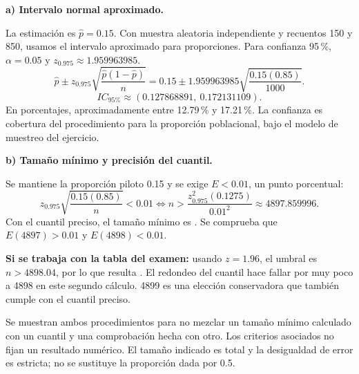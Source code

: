 \textbf{a) Intervalo normal aproximado.}\par\nopagebreak[4]
La estimación es $\widehat p=0.15$. Con muestra aleatoria independiente y recuentos 150 y 850, usamos el intervalo aproximado para proporciones. Para confianza 95\,\%, $\alpha=0.05$ y $z_{0.975}\approx1.959963985$.
\[
\widehat p\pm z_{0.975}\sqrt{\frac{\widehat p(1-\widehat p)}n}
=0.15\pm1.959963985\sqrt{\frac{0.15(0.85)}{1000}}.
\]
\[
\boxed{IC_{\text{95\%}}\approx(0.127868891,\ 0.172131109).}
\]
En porcentajes, aproximadamente entre 12.79\,\% y 17.21\,\%. La confianza es cobertura del procedimiento para la proporción poblacional, bajo el modelo de muestreo del ejercicio.

\textbf{b) Tamaño mínimo y precisión del cuantil.}\par\nopagebreak[4]
Se mantiene la proporción piloto 0.15 y se exige $E<0.01$, un punto porcentual:
\[
z_{0.975}\sqrt{\frac{0.15(0.85)}n}<0.01
\iff n>\frac{z_{0.975}^2(0.1275)}{0.01^2}
\approx4897.859996.
\]
Con el cuantil preciso, el tamaño mínimo es . Se comprueba que $E(4897)>0.01$ y $E(4898)<0.01$.

\textbf{Si se trabaja con la tabla del examen:} usando $z=1.96$, el umbral es $n>4898.04$, por lo que resulta . El redondeo del cuantil hace fallar por muy poco a 4898 en este segundo cálculo. 4899 es una elección conservadora que también cumple con el cuantil preciso.

Se muestran ambos procedimientos para no mezclar un tamaño mínimo calculado con un cuantil y una comprobación hecha con otro. Los criterios asociados no fijan un resultado numérico. El tamaño indicado es total y la desigualdad de error es estricta; no se sustituye la proporción dada por 0.5.
